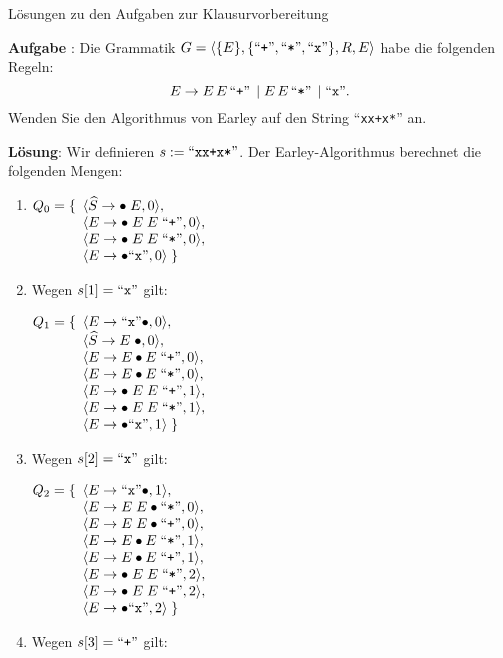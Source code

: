 \documentclass{article}
\def\pair(#1,#2){\langle #1, #2 \rangle}
\newcounter{aufgabe}
\newcommand{\exercise}{\vspace*{0.1cm}

\stepcounter{aufgabe}
\vspace*{0.3cm}

\noindent
\textbf{Aufgabe \arabic{aufgabe}}: }
\newcommand{\solution}{
\vspace*{0.3cm}

\noindent
\textbf{L\"osung}: }
\newcommand{\quoted}[1]{\mbox{``\texttt{#1}''}}
\def\pair(#1,#2){\langle #1, #2 \rangle}
\begin{document}
\noindent
{\large  L\"osungen zu den Aufgaben zur Klausurvorbereitung}
\vspace{0.5cm}

\exercise
Die Grammatik $G = \langle \{ E \}, \{ \quoted{+}, \quoted{*}, \quoted{x} \}, R, E \rangle$
habe  die folgenden Regeln:
\[ E \rightarrow E\, E\, \quoted{+}\, \mid E\, E\, \quoted{*}\, \mid \quoted{x}. \]
Wenden Sie den Algorithmus von Earley auf den String ``\texttt{xx+x*}'' an.

\solution
Wir definieren  $s := \mbox{``\texttt{xx+x*}''}$.
Der Earley-Algorithmus berechnet die folgenden Mengen:
\begin{enumerate}
\item $Q_0 = \{
       \begin{array}[t]{l}
         \pair(\widehat{S} \rightarrow \bullet\; E, 0), \\
         \pair(E \rightarrow \bullet \;E\; E\; \quoted{+}, 0), \\
         \pair(E \rightarrow \bullet \;E\; E\; \quoted{*}, 0), \\
         \pair(E \rightarrow \bullet \quoted{x}, 0)\;  \}
       \end{array}
       $
\item Wegen $s[1] = \quoted{x}$ gilt:

       $Q_1 = \{
       \begin{array}[t]{l}
         \pair(E \rightarrow  \quoted{x}\bullet, 0), \\
         \pair(\widehat{S} \rightarrow  E\;\bullet, 0), \\
         \pair(E \rightarrow  E\bullet E\; \quoted{+}, 0), \\
         \pair(E \rightarrow  E\bullet E\; \quoted{*}, 0), \\
         \pair(E \rightarrow \bullet\; E\; E\; \quoted{+}, 1), \\
         \pair(E \rightarrow \bullet\; E\; E\; \quoted{*}, 1), \\
         \pair(E \rightarrow \bullet \quoted{x}, 1)\; \}
       \end{array}
       $
\item Wegen $s[2] = \quoted{x}$ gilt:

      $Q_2 = \{
       \begin{array}[t]{l}    
         \pair(E \rightarrow  \quoted{x}\bullet, 1), \\
         \pair(E \rightarrow  E\; E\bullet \quoted{*}, 0), \\
         \pair(E \rightarrow  E\; E\bullet \quoted{+}, 0), \\
         \pair(E \rightarrow  E\bullet E\; \quoted{*}, 1), \\
         \pair(E \rightarrow  E\bullet E\; \quoted{+}, 1), \\
         \pair(E \rightarrow \bullet\; E\; E\; \quoted{*}, 2), \\
         \pair(E \rightarrow \bullet\; E\; E\; \quoted{+}, 2), \\
         \pair(E \rightarrow \bullet \quoted{x}, 2)\; \}
       \end{array}
       $
\item Wegen $s[3] = \quoted{+}$ gilt:


\end{enumerate}
\end{document}
